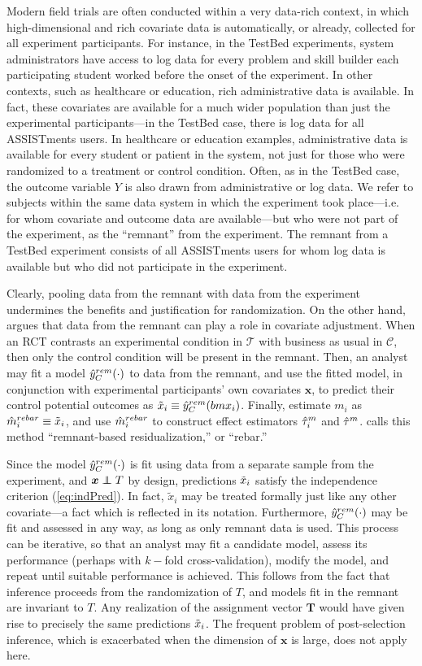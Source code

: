 Modern field trials are often conducted within a very data-rich
context, in which high-dimensional and rich covariate data is
automatically, or already, collected for all experiment participants.
For instance, in the TestBed experiments, system administrators have
access to log data for every problem and skill builder each
participating student worked before the onset of the experiment.
In other contexts, such as healthcare or education, rich
administrative data is available.
In fact, these covariates are available for a much wider population
than just the experimental participants---in the TestBed case, there
is log data for all ASSISTments users.
In healthcare or education examples, administrative data is available
for every student or patient in the system, not just for those who
were randomized to a treatment or control condition.
Often, as in the TestBed case, the outcome variable $Y$ is also drawn from administrative or
log data.
We refer to subjects within the same data system in which the
experiment took place---i.e. for whom covariate and outcome data are
available---but who were not part of the experiment, as the ``remnant'' from the experiment.
The remnant from a TestBed experiment consists of all ASSISTments
users for whom log data is available but who did not participate in
the experiment.

Clearly, pooling data from the remnant with data from the experiment
undermines the benefits and justification for randomization.
On the other hand, \citet{rebarEDM} argues that data from the remnant
can play a role in covariate adjustment.
When an RCT contrasts an experimental condition in $\mathcal{T}$ with
business as usual in $\mathcal{C}$, then only the control condition
will be present in the remnant.
Then, an analyst may fit a model $\hat{y}_C^{rem}(\cdot)$ to data
from the remnant, and use the fitted model, in conjunction with
experimental participants' own covariates $\bm{x}$, to predict their
control potential outcomes as $\tilde{x}_i\equiv \hat{y}_C^{rem}(bm{x}_i)$.
Finally, estimate $m_i$ as $\hat{m}_i^{rebar} \equiv \tilde{x}_i$, and
use $\hat{m}_i^{rebar}$ to construct effect estimators $\hat{\tau}_i^m$ and
$\hat{\tau}^m$.
\citet{rebarEDM} calls this method ``remnant-based residualization,''
or ``rebar.''

Since the model $\hat{y}_C^{rem}(\cdot) $ is fit using data from a
separate sample from the experiment, and $\bm{x}\independent T$ by
design, predictions $\tilde{x}_i $ satisfy the
independence criterion (\ref{eq:indPred}).
In fact, $\tilde{x}_{i}$ may be treated formally just like any other
covariate---a fact which is reflected in its notation.
Furthermore, $\hat{y}_C^{rem}(\cdot)$ may be fit and assessed in any way, as
long as only remnant data is used.
This process can be iterative, so that an analyst may fit a candidate
model, assess its performance (perhaps with $k-$fold
cross-validation), modify the model, and repeat until suitable
performance is achieved.
This follows from the fact that inference proceeds from the
randomization of $T$, and models fit in the remnant are invariant to
$T$.
Any realization of the assignment vector $\bm{T}$ would have given
rise to precisely the same predictions $\tilde{x}_i $.
The frequent problem of post-selection inference, which is exacerbated
when the dimension of $\bm{x}$ is large, does not apply here.

